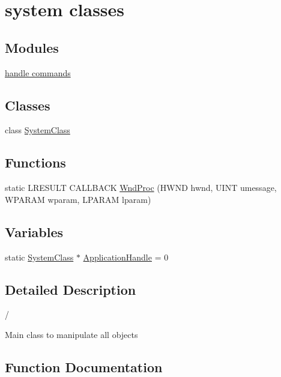 \hypertarget{group__system}{}\section{system classes}
\label{group__system}
\subsection*{Modules}
\begin{DoxyCompactItemize}
\item 
\hyperlink{group__commands}{handle commands}
\end{DoxyCompactItemize}
\subsection*{Classes}
\begin{DoxyCompactItemize}
\item 
class \hyperlink{class_system_class}{System\+Class}
\end{DoxyCompactItemize}
\subsection*{Functions}
\begin{DoxyCompactItemize}
\item 
static L\+R\+E\+S\+U\+LT C\+A\+L\+L\+B\+A\+CK \hyperlink{group__system_ga2959c9c839c65b3883783686b02aeee0}{Wnd\+Proc} (H\+W\+ND hwnd, U\+I\+NT umessage, W\+P\+A\+R\+AM wparam, L\+P\+A\+R\+AM lparam)
\end{DoxyCompactItemize}
\subsection*{Variables}
\begin{DoxyCompactItemize}
\item 
static \hyperlink{class_system_class}{System\+Class} $\ast$ \hyperlink{group__system_ga91fa2e9b9bad2bce97a4f7e9b5337e1a}{Application\+Handle} = 0
\end{DoxyCompactItemize}


\subsection{Detailed Description}
/

Main class to manipulate all objects 

\subsection{Function Documentation}
\mbox{\label{group__system_ga2959c9c839c65b3883783686b02aeee0}} 
